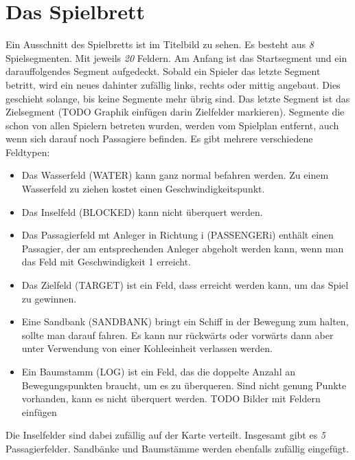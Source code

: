 \documentclass[12pt,a4paper, ngerman, oneside]{scrartcl}
\newcommand{\Tiles}{\emph{8}}
\newcommand{\FieldsPerTile}{\emph{20}}
\newcommand{\Passagiere}{\emph{5}}
\begin{document}
\section{Das Spielbrett}
Ein Ausschnitt des Spielbretts ist im Titelbild zu sehen. Es besteht aus \emph{\Tiles} Spielsegmenten. Mit jeweils \emph{\FieldsPerTile} Feldern. Am Anfang ist das Startsegment und ein darauffolgendes Segment aufgedeckt. Sobald ein Spieler das letzte Segment betritt, wird ein neues dahinter zufällig links, rechts oder mittig angebaut. Dies geschieht solange, bis keine Segmente mehr übrig sind. Das letzte Segment ist das Zielsegment (TODO Graphik einfügen darin Zielfelder markieren). Segmente die schon von allen Spielern betreten wurden, werden vom Spielplan entfernt, auch wenn sich darauf noch Passagiere befinden.
Es gibt mehrere verschiedene Feldtypen:
\begin{itemize}
\item Das Wasserfeld (WATER) kann ganz normal befahren werden. Zu einem Wasserfeld zu ziehen kostet einen Geschwindigkeitspunkt.
\item Das Inselfeld (BLOCKED) kann nicht überquert werden.
\item Das Passagierfeld mt Anleger in Richtung i (PASSENGERi) enthält einen Passagier, der am entsprechenden Anleger abgeholt werden kann, wenn man das Feld mit Geschwindigkeit 1 erreicht.
\item Das Zielfeld (TARGET) ist ein Feld, dass erreicht werden kann, um das Spiel zu gewinnen.
\item Eine Sandbank (SANDBANK) bringt ein Schiff in der Bewegung zum halten, sollte man darauf fahren. Es kann nur rückwärts oder vorwärts dann aber unter Verwendung von einer Kohleeinheit verlassen werden.
\item Ein Baumstamm (LOG) ist ein Feld, das die doppelte Anzahl an Bewegungspunkten braucht, um es zu überqueren. Sind nicht genung Punkte vorhanden, kann es nicht überquert werden. TODO Bilder mit Feldern einfügen
\end{itemize}
Die Inselfelder sind dabei zufällig auf der Karte verteilt. Insgesamt gibt es \emph{\Passagiere} Passagierfelder. Sandbänke und Baumstämme werden ebenfalls zufällig eingefügt.
\end{document}
